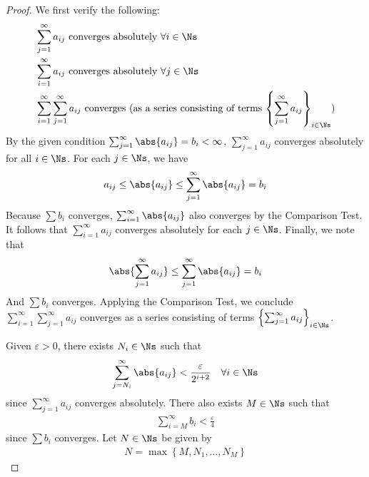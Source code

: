 \documentclass[thmcnt=section, 12pt]{elegantbook}
\begin{document}
\begin{proof}
    We first verify the following:
    \begin{align*}
        &\sum_{j=1}^\infty a_{ij} \ \text{converges absolutely} \ \forall i \in \Ns \\
        &\sum_{i=1}^\infty a_{ij} \ \text{converges absolutely} \ \forall j \in \Ns \\
        &\sum_{i=1}^\infty \sum_{j=1}^\infty a_{ij} \ \text{converges (as a series consisting of terms $\left\{\sum_{j=1}^\infty a_{ij}\right\}_{i \in \Ns}$)}
    \end{align*}
    By the given condition $\sum_{j=1}^\infty \abs{a_{ij}} = b_i < \infty$, $\sum_{j=1}^\infty a_{ij}$ converges absolutely for all $i \in \Ns$. 
    For each $j \in \Ns$, we have
    \begin{align*}
        a_{ij} \leq \abs{a_{ij}} 
        \leq \sum_{j=1}^\infty \abs{a_{ij}} 
        = b_i
    \end{align*}
    Because $\sum b_i$ converges, $\sum_{i=1}^\infty \abs{a_{ij}}$ also converges by the Comparison Test. It follows that $\sum_{i=1}^\infty a_{ij}$ converges absolutely for each $j \in \Ns$.
    Finally, we note that 
    \begin{align*}
        \abs{\sum_{j=1}^\infty a_{ij}}
        \leq \sum_{j=1}^\infty \abs{a_{ij}}
        = b_i
    \end{align*}
    And $\sum b_i$ converges. Applying the Comparison Test, we conclude $\sum_{i=1}^\infty \sum_{j=1}^\infty a_{ij}$ converges as a series consisting of terms $\left\{\sum_{j=1}^\infty a_{ij}\right\}_{i \in \Ns}$.

    \par Given $\varepsilon > 0$, there exists $N_i \in \Ns$ such that 
    \begin{align}
        \sum_{j=N_i}^\infty \abs{a_{ij}} < \frac{\varepsilon}{2^{i+2}} 
        \quad \forall i \in \Ns 
        \label{eq:20}
    \end{align}
    since $\sum_{j=1}^\infty a_{ij}$ converges absolutely.
    There also exists $M \in \Ns$ such that
    \begin{align}
        \sum_{i=M}^\infty b_i < \frac{\varepsilon}{4}
        \label{eq:21}
    \end{align}
    since $\sum b_i$ converges.
    Let $N \in \Ns$ be given by 
    \begin{align}
        N = \max \left\{M, N_1, \ldots, N_M\right\}
        \label{eq:22}
    \end{align}


\end{proof}
\end{document}
